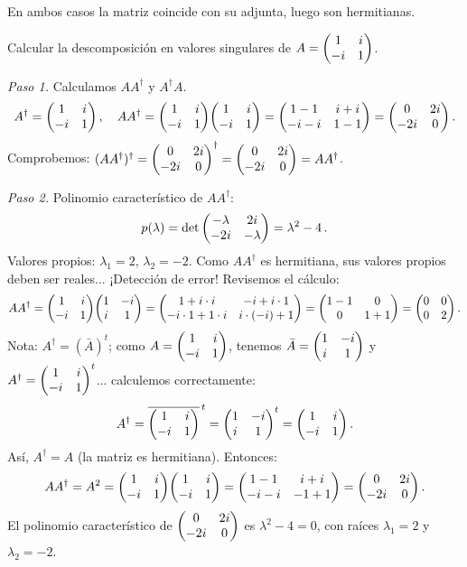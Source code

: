 \begin{questions}
\begin{solution}
    En ambos casos la matriz coincide con su adjunta, luego son hermitianas.
  \end{solution}


  \question
  Calcular la descomposición en valores singulares de $A=\mqty(1&i\\-i&1)$.
  \begin{solution}
    \textit{Paso 1.} Calculamos $AA^\dagger$ y $A^\dagger A$.
    \[
      A^\dagger = \mqty(1&i\\-i&1)\,,\quad AA^\dagger = \mqty(1&i\\-i&1)\mqty(1&i\\-i&1)=\mqty(1-1&i+i\\-i-i&1-1)=\mqty(0&2i\\-2i&0)\,.
    \]
    Comprobemos: $(AA^\dagger)^\dagger=\mqty(0&2i\\-2i&0)^\dagger=\mqty(0&2i\\-2i&0)=AA^\dagger$. \checkmark

    \textit{Paso 2.} Polinomio característico de $AA^\dagger$:
    \[
      p(\lambda)=\det\mqty(-\lambda&2i\\-2i&-\lambda)=\lambda^2-4\,.
    \]
    Valores propios: $\lambda_1=2$, $\lambda_2=-2$. Como $AA^\dagger$ es hermitiana, sus valores propios deben ser reales... ¡Detección de error! Revisemos el cálculo:
    \[
      AA^\dagger = \mqty(1&i\\-i&1)\mqty(1&-i\\i&1)=\mqty(1+i\cdot i & -i+i\cdot 1\\-i\cdot 1+1\cdot i & i\cdot(-i)+1)=\mqty(1-1&0\\0&1+1)=\mqty(0&0\\0&2)\,.
    \]
    Nota: $A^\dagger=(\bar{A})^t$; como $A=\mqty(1&i\\-i&1)$, tenemos $\bar{A}=\mqty(1&-i\\i&1)$ y $A^\dagger=\mqty(1&i\\-i&1)^t$... calculemos correctamente:
    \[
      A^\dagger = \overline{\mqty(1&i\\-i&1)}^{\,t} = \mqty(1&-i\\i&1)^t=\mqty(1&i\\-i&1)\,.
    \]
    Así, $A^\dagger=A$ (la matriz es hermitiana). Entonces:
    \[
      AA^\dagger = A^2 = \mqty(1&i\\-i&1)\mqty(1&i\\-i&1)=\mqty(1-1&i+i\\-i-i&-1+1)=\mqty(0&2i\\-2i&0)\,.
    \]
    El polinomio característico de $\mqty(0&2i\\-2i&0)$ es $\lambda^2-4=0$, con raíces $\lambda_1=2$ y $\lambda_2=-2$.


\end{solution}
\end{questions}
